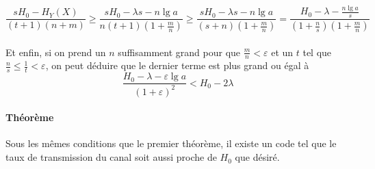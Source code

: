 	\[\frac{sH_0-H_Y(X)}{(t+1)(n+m)} \ge \frac{sH_0-\lambda s-n\lg a}{n(t+1)(1+\frac{m}{n})} \ge 
	\frac{sH_0-\lambda s-n\lg a}{(s+n)(1+\frac{m}{n})} = \frac{H_0-\lambda-\frac{n\lg a}{s}}{(1+\frac{n}{s})(1+\frac{m}{n})}\]
	
	\paragraph{}
	Et enfin, si on prend un $n$ suffisamment grand pour que $\frac{m}{n}<\varepsilon$ et un $t$ tel que $\frac{n}{s} \le \frac{1}{t} < \varepsilon$, on peut 
	déduire que le dernier terme est plus grand ou égal à
	\[\frac{H_0-\lambda-\varepsilon\lg a}{(1+\varepsilon)^2}<H_0-2\lambda\]
	
	
	
	
	
	
	
	
	\paragraph{Théorème}
	Sous les mêmes conditions que le premier théorème, il existe un code tel que le taux de transmission du canal soit aussi proche de $H_0$ que désiré.

